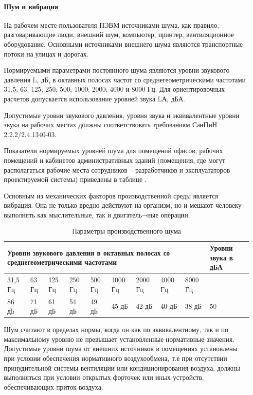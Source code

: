 \paragraph{Шум и вибрация}

На рабочем месте пользователя ПЭВМ источниками шума, как правило, разговаривающие люди, внешний шум, компьютер, принтер, вентиляционное оборудование. Основными источниками внешнего шума являются транспортные потоки на улицах и дорогах.

Нормируемыми параметрами постоянного шума являются уровни звукового давления L, дБ, в октавных полосах частот со среднегеометрическими частотами 31,5; 63; 125; 250; 500; 1000; 2000; 4000 и 8000 Гц. Для ориентировочных расчетов допускается использование уровней звука LА, дБА.

Допустимые уровни звукового давления, уровня звука и эквивалентные уровни звука на рабочих местах должны соответствовать требованиям СанПиН 2.2.2/2.4.1340-03.

Показатели нормируемых уровней шума для помещений офисов, рабочих помещений и кабинетов административных зданий (помещения, где могут располагаться рабочие места сотрудников – разработчиков и эксплуататоров проектируемой системы) приведены в таблице .

Основным из механических факторов производственной среды является вибрация. Она не только вредно действуют на организм, но и мешают человеку выполнять как мыслительные, так и двигатель¬ные операции. 

\begin{table}[!htb]
	\caption{Параметры производственного шума}\label{bzd:noize}
    \centering
	\begin{tabular}{|p{1cm}|p{1cm}|p{1cm}|p{1cm}|p{1cm}|p{1cm}|p{1cm}|p{1cm}|p{1cm}|p{2cm}|}
	\hline 
	\multicolumn{9}{|p{12cm}|}{Уровни звукового давления в октавных полосах со среднегеометрическими частотами} & Уровни звука в дБА \\ 
	\hline 
	31,5 Гц & 63 Гц & 125 Гц & 250 Гц & 500 Гц & 1000 Гц & 2000 Гц & 4000 Гц & 8000 Гц & ~\ \\ 
	\hline 
	86 дБ & 71 дБ & 61 дБ & 54 дБ & 49 дБ & 45 дБ & 42 дБ & 40 дБ & 38 дБ & 50 \\ 
	\hline 
	\end{tabular} 
    		
\end{table}

Шум считают в пределах нормы, когда он как по эквивалентному, так и по максимальному уровню не превышает установленные нормативные значения.
Допустимые уровни шума от внешних источников в помещениях установлены при условии обеспечения нормативного воздухообмена, т.е при отсутствии принудительной системы вентиляции или кондиционирования воздуха, должны выполняться при условии открытых форточек или иных устройств, обеспечивающих приток воздуха.

